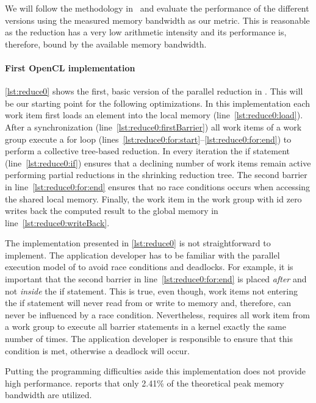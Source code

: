 We will follow the methodology in~\cite{Harris2007} and evaluate the performance of the different versions using the measured memory bandwidth as our metric.
This is reasonable as the reduction has a very low arithmetic intensity and its performance is, therefore, bound by the available memory bandwidth.

\paragraph{First OpenCL implementation}
\autoref{lst:reduce0} shows the first, basic version of the parallel reduction in \OpenCL.
This will be our starting point for the following optimizations.
In this implementation each work item first loads an element into the local memory (line~\ref{lst:reduce0:load}).
After a synchronization (line~\ref{lst:reduce0:firstBarrier}) all work items of a work group execute a for loop (lines~\ref{lst:reduce0:for:start}--\ref{lst:reduce0:for:end}) to perform a collective tree-based reduction.
In every iteration the if statement (line~\ref{lst:reduce0:if}) ensures that a declining number of work items remain active performing partial reductions in the shrinking reduction tree.
The second barrier in line~\ref{lst:reduce0:for:end} ensures that no race conditions occurs when accessing the shared local memory.
Finally, the work item in the work group with id zero writes back the computed result to the global memory in line~\ref{lst:reduce0:writeBack}.

The implementation presented in \autoref{lst:reduce0} is not straightforward to implement.
The application developer has to be familiar with the parallel execution model of \OpenCL to avoid race conditions and deadlocks.
For example, it is important that the second barrier in line~\ref{lst:reduce0:for:end} is placed \emph{after} and not \emph{inside} the if statement.
This is true, even though, work items not entering the if statement will never read from or write to memory and, therefore, can never be influenced by a race condition.
Nevertheless, \OpenCL requires all work item from a work group to execute all barrier statements in a kernel exactly the same number of times.
The application developer is responsible to ensure that this condition is met, otherwise a deadlock will occur.

Putting the programming difficulties aside this implementation does not provide high performance.
\citeauthor{Harris2007} reports that only 2.41\% of the theoretical peak memory bandwidth are utilized. 

